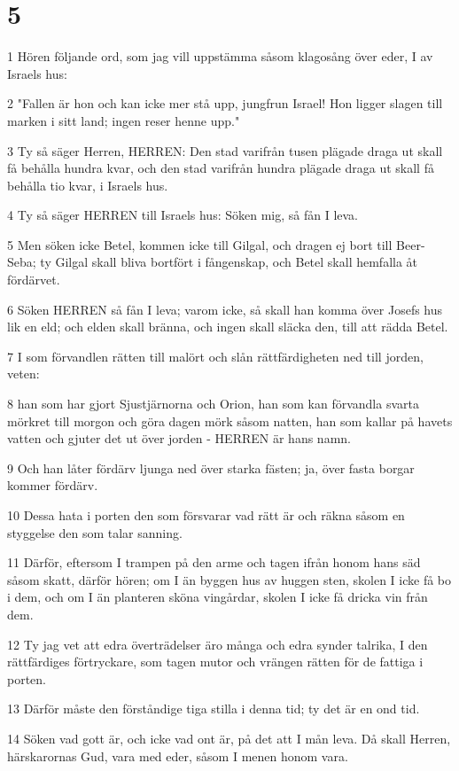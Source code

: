 \chapter{5}

\par 1 Hören följande ord, som jag vill uppstämma såsom klagosång över eder, I av Israels hus:
\par 2 "Fallen är hon och kan icke mer stå upp, jungfrun Israel! Hon ligger slagen till marken i sitt land; ingen reser henne upp."
\par 3 Ty så säger Herren, HERREN: Den stad varifrån tusen plägade draga ut skall få behålla hundra kvar, och den stad varifrån hundra plägade draga ut skall få behålla tio kvar, i Israels hus.
\par 4 Ty så säger HERREN till Israels hus: Söken mig, så fån I leva.
\par 5 Men söken icke Betel, kommen icke till Gilgal, och dragen ej bort till Beer-Seba; ty Gilgal skall bliva bortfört i fångenskap, och Betel skall hemfalla åt fördärvet.
\par 6 Söken HERREN så fån I leva; varom icke, så skall han komma över Josefs hus lik en eld; och elden skall bränna, och ingen skall släcka den, till att rädda Betel.
\par 7 I som förvandlen rätten till malört och slån rättfärdigheten ned till jorden, veten:
\par 8 han som har gjort Sjustjärnorna och Orion, han som kan förvandla svarta mörkret till morgon och göra dagen mörk såsom natten, han som kallar på havets vatten och gjuter det ut över jorden - HERREN är hans namn.
\par 9 Och han låter fördärv ljunga ned över starka fästen; ja, över fasta borgar kommer fördärv.
\par 10 Dessa hata i porten den som försvarar vad rätt är och räkna såsom en styggelse den som talar sanning.
\par 11 Därför, eftersom I trampen på den arme och tagen ifrån honom hans säd såsom skatt, därför hören; om I än byggen hus av huggen sten, skolen I icke få bo i dem, och om I än planteren sköna vingårdar, skolen I icke få dricka vin från dem.
\par 12 Ty jag vet att edra överträdelser äro många och edra synder talrika, I den rättfärdiges förtryckare, som tagen mutor och vrängen rätten för de fattiga i porten.
\par 13 Därför måste den förståndige tiga stilla i denna tid; ty det är en ond tid.
\par 14 Söken vad gott är, och icke vad ont är, på det att I mån leva. Då skall Herren, härskarornas Gud, vara med eder, såsom I menen honom vara.
